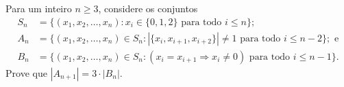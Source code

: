 Para um inteiro \(n \ge 3\), considere os conjuntos
\begin{align*}
S_n &= \{ (x_1,x_2,\ldots,x_n) : x_i \in \{0, 1, 2\} \text{ para todo } i \le n \}; \\
A_n &= \{(x_1,x_2,\ldots,x_n) \in S_n : |\{x_i, x_{i+1}, x_{i+2}\}| \ne 1 \text{ para todo } i \le n - 2\}; \text{ e} \\
B_n &= \{(x_1,x_2,\ldots,x_n) \in S_n : (x_i = x_{i+1} \Rightarrow x_i \ne 0) \text{ para todo } i \le n - 1\} .
\end{align*}
Prove que \(|A_{n+1}| = 3 \cdot |B_n|\).
